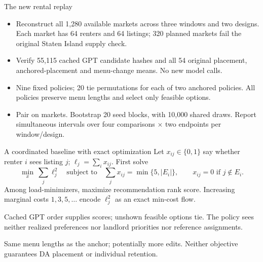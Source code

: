 \begin{frame}{The new rental replay}
\small
\begin{itemize}
\item Reconstruct all 1,280 available markets across three windows and two designs.
Each market has 64 renters and 64 listings; 320 planned markets fail the original Staten Island supply check.
\item Verify 55,115 cached GPT candidate hashes and all 54 original placement,
anchored-placement and menu-change means. No new model calls.
\item Nine fixed policies; 20 tie permutations for each of two anchored policies.
All policies preserve menu lengths and select only feasible options.
\item Pair on markets. Bootstrap 20 seed blocks, with 10,000 shared draws.
Report simultaneous intervals over four comparisons $\times$ two endpoints per window/design.
\end{itemize}
\end{frame}

\begin{frame}{A coordinated baseline with exact optimization}
Let $x_{ij}\in\{0,1\}$ say whether renter $i$ sees listing $j$; $\ell_j=\sum_i x_{ij}$.
First solve
\[
\min_x\ \sum_j \ell_j^2
\quad\text{subject to}\quad
\sum_j x_{ij}=\min\{5,|E_i|\},\qquad x_{ij}=0\text{ if }j\notin E_i.
\]
\small
Among load-minimizers, maximize recommendation rank score.
Increasing marginal costs $1,3,5,\ldots$ encode $\ell_j^2$ as an exact min-cost flow.

\medskip
Cached GPT order supplies scores; unshown feasible options tie.
The policy sees neither realized preferences nor landlord priorities nor reference assignments.

\medskip
Same menu lengths as the anchor; potentially more edits. Neither objective guarantees DA placement or individual retention.
\end{frame}

